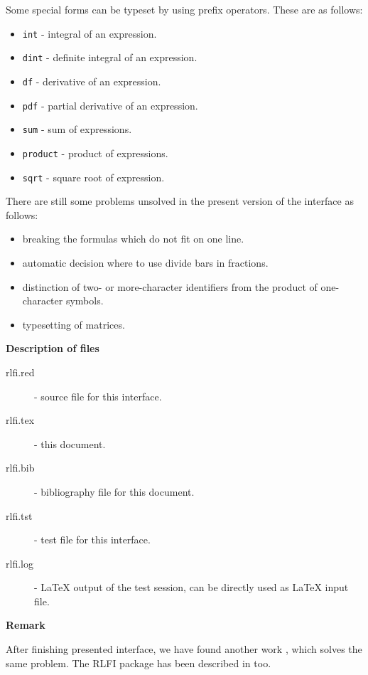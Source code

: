 Some special forms can be typeset by using \REDUCE{} prefix operators.
These are as follows:
\begin{itemize}
\item {\tt int} - integral of an expression.
\item {\tt dint} - definite integral of an expression.
\item {\tt df} - derivative of an expression.
\item {\tt pdf} - partial derivative of an expression.
\item {\tt sum} - sum of expressions.
\item {\tt product} - product of expressions.
\item {\tt sqrt} - square root of expression.
\end{itemize}
There are still some problems unsolved in the present version of the
interface as follows:
\begin{itemize}
\item breaking the formulas which do not fit on one line.
\item automatic decision where to use divide bars in fractions.
\item distinction of two- or more-character identifiers from the product
  of one-character symbols.
\item typesetting of matrices.
\end{itemize}

\vskip0.5cm

\centerline{\bf Description of files}

\begin{description}
\item[rlfi.red] - \REDUCE{} source file for this interface.
\item[rlfi.tex] - this document.
\item[rlfi.bib] - bibliography file for this document.
\item[rlfi.tst] - test file for this interface.
\item[rlfi.log] - \LaTeX{} output of the test session,
                   can be directly used as \LaTeX{} input file.
\end{description}


\centerline{\bf Remark}

After finishing presented interface, we have found another work
\cite{Antweiler:89}, which solves the same problem. The RLFI package has
been described in \cite{Drska:90} too.



